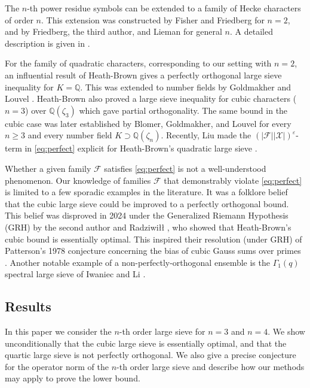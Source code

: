 \documentclass[12pt,reqno]{amsart}
\numberwithin{equation}{section}
\newcommand{\Q}{\mathbb{Q}}
\begin{document}
The $n$-th power residue symbols can be extended to a family of Hecke characters of order $n$. This extension was constructed by Fisher and Friedberg \cite{FF04} for $n=2$, and by Friedberg, the third author, and Lieman \cite{FHL} for general $n$. A detailed description is given in \cite[Section 2]{GL13}.

For the family of quadratic characters, corresponding to our setting with $n=2$, an influential result of Heath-Brown \cite{HB95} gives a perfectly orthogonal large sieve inequality for $K= \Q$. This was extended to number fields by Goldmakher and Louvel \cite{GL13}. Heath-Brown \cite{HB} also proved a large sieve inequality for cubic characters ($n=3$) over $\Q(\zeta_3)$ which gave partial orthogonality. The same bound in the cubic case was later established by Blomer, Goldmakher, and Louvel \cite{BGL} for every $n \geq 3$ and every number field $K \supset \Q(\zeta_n)$. Recently, Liu \cite{Liu} made the $(|\mathcal{F}| |\mathcal{X}|)^{\varepsilon}$-term in \eqref{eq:perfect} explicit for Heath-Brown's quadratic large sieve \cite{HB95}.

Whether a given family $\mathcal{F}$ satisfies \eqref{eq:perfect} is not a well-understood phenomenon.
Our knowledge of families $\mathcal{F}$ that demonstrably violate \eqref{eq:perfect} is limited to a few sporadic examples in the literature. It was a folklore belief \cite{BGL,HB} that the cubic large sieve could be improved to a perfectly orthogonal bound. This belief was disproved in 2024 under the Generalized Riemann Hypothesis (GRH) by the second author and Radziwi{\l\l} \cite{DR}, who showed that Heath-Brown's cubic bound is essentially optimal. This inspired their resolution (under GRH) of Patterson's 1978 conjecture \cite{Pat3} concerning the bias of cubic Gauss sums over primes \cite{DR}. Another notable example of a non-perfectly-orthogonal ensemble is the
$\Gamma_1(q)$ spectral large sieve of Iwaniec and Li \cite{IL07}.

\subsection{Results}

In this paper we consider the $n$-th order large sieve for $n=3$ and $n=4$. We show unconditionally that the cubic large sieve is essentially optimal, and that the quartic large sieve is not perfectly orthogonal. We also give a precise conjecture for the operator norm of the $n$-th order large sieve and describe how our methods may apply to prove the lower bound.
\end{document}
